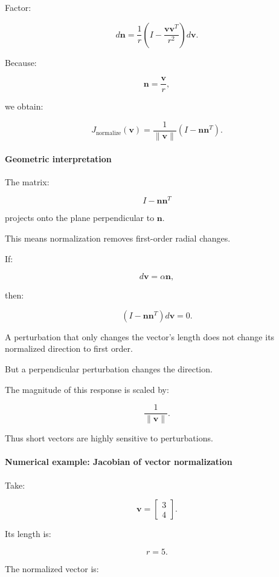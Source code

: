 Factor:

\[
d\mathbf n= \frac1r \left( I-\frac{\mathbf v\mathbf v^T}{r^2} \right)d\mathbf v.
\]

Because:

\[
\mathbf n=\frac{\mathbf v}{r},
\]

we obtain:

\[
\boxed{ J_{\mathrm{normalize}}(\mathbf v) = \frac1{\|\mathbf v\|} (I-\mathbf n\mathbf n^T) }.
\]

\paragraph{Geometric interpretation}\label{02-foundations-ii-ch027-geometric-interpretation}

The matrix:

\[
I-\mathbf n\mathbf n^T
\]

projects onto the plane perpendicular to \(\mathbf n\).

This means normalization removes first-order radial changes.

If:

\[
d\mathbf v=\alpha\mathbf n,
\]

then:

\[
(I-\mathbf n\mathbf n^T)d\mathbf v=0.
\]

A perturbation that only changes the vector's length does not change its normalized direction to first order.

But a perpendicular perturbation changes the direction.

The magnitude of this response is scaled by:

\[
\frac1{\|\mathbf v\|}.
\]

Thus short vectors are highly sensitive to perturbations.

\paragraph{Numerical example: Jacobian of vector normalization}\label{02-foundations-ii-ch027-numerical-example-jacobian-of-vector-normalization}

Take:

\[
\mathbf v= \begin{bmatrix} 3\\4 \end{bmatrix}.
\]

Its length is:

\[
r=5.
\]

The normalized vector is:

